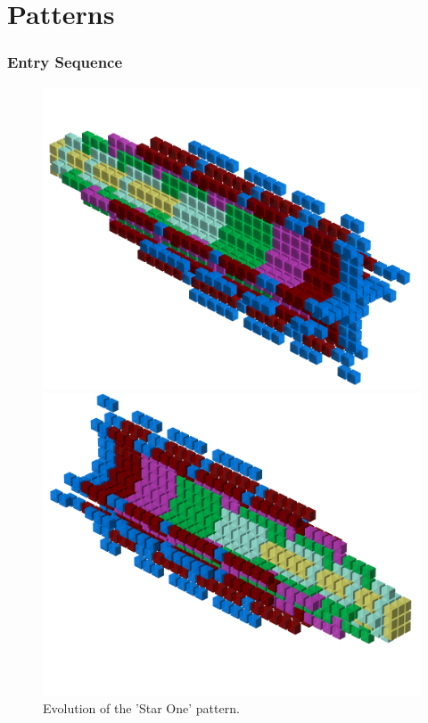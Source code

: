 \chapter{Patterns} 
\lstset{style=6502Style}


\subsection{Entry Sequence}
\clearpage
\begin{figure}[H]
    \centering
    \begin{adjustbox}{width=12cm,center}
      \includegraphics[width=12cm]{src/patterns/pattern0-45.png}%
    \end{adjustbox}
    \begin{adjustbox}{width=12cm,margin=0cm -2cm}
      \includegraphics[width=12cm]{src/patterns/pattern0-225.png}%
    \end{adjustbox}
\caption{Evolution of the 'Star One' pattern.}
\end{figure}


